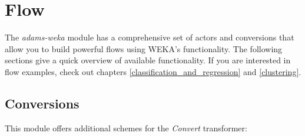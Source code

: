 %

\chapter{Flow}
The \textit{adams-weka} module has a comprehensive set of actors and conversions
that allow you to build powerful flows using WEKA's functionality. The following
sections give a quick overview of available functionality. If you are interested
in flow examples, check out chapters \ref{classification_and_regression} and
\ref{clustering}.

\section{Conversions}
This module offers additional schemes for the \textit{Convert} transformer:
